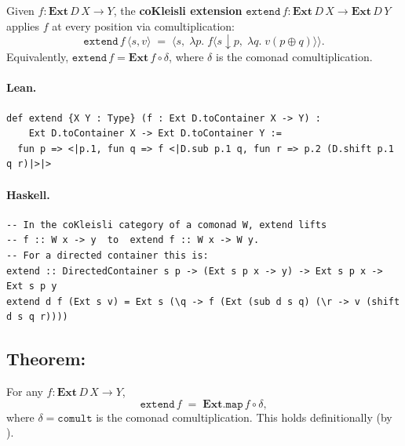 \documentclass[11pt,a4paper]{article}
\begin{document}
\begin{defn}
Given $f : \mathbf{Ext}\,D\,X \to Y$, the \textbf{coKleisli extension}
$\mathtt{extend}\,f : \mathbf{Ext}\,D\,X \to \mathbf{Ext}\,D\,Y$
applies $f$ at every position via comultiplication:
\[
  \mathtt{extend}\,f\,\langle s, v \rangle
  \;=\;
  \bigl\langle s,\;
    \lambda p.\; f\bigl\langle s \mathop{\downarrow} p,\;
                    \lambda q.\; v(p \oplus q)\bigr\rangle
  \bigr\rangle.
\]
Equivalently, $\mathtt{extend}\,f = \mathbf{Ext}\,f \circ \delta$, where
$\delta$ is the comonad comultiplication.
\end{defn}

\paragraph{Lean.}
\begin{lstlisting}[style=lean]
def extend {X Y : Type} (f : Ext D.toContainer X -> Y) :
    Ext D.toContainer X -> Ext D.toContainer Y :=
  fun p => <|p.1, fun q => f <|D.sub p.1 q, fun r => p.2 (D.shift p.1 q r)|>|>
\end{lstlisting}

\paragraph{Haskell.}
\begin{lstlisting}[style=haskell]
-- In the coKleisli category of a comonad W, extend lifts
-- f :: W x -> y  to  extend f :: W x -> W y.
-- For a directed container this is:
extend :: DirectedContainer s p -> (Ext s p x -> y) -> Ext s p x -> Ext s p y
extend d f (Ext s v) = Ext s (\q -> f (Ext (sub d s q) (\r -> v (shift d s q r))))
\end{lstlisting}


\subsection{Theorem: }

\begin{prop}
For any $f : \mathbf{Ext}\,D\,X \to Y$,
\[
  \mathtt{extend}\,f \;=\; \mathbf{Ext}\mathord{.}\mathtt{map}\,f \circ \delta,
\]
where $\delta = \mathtt{comult}$ is the comonad comultiplication.  This holds
definitionally (by ).
\end{prop}
\end{document}
